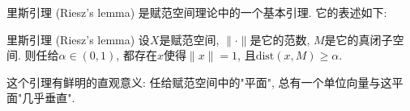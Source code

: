 
里斯引理 (Riesz's lemma) 是赋范空间理论中的一个基本引理. 它的表述如下:

\begin{lemma}{里斯引理 (Riesz's lemma)}
设$X$是赋范空间, $\|\cdot\|$是它的范数, $M$是它的真闭子空间. 则任给$\alpha\in(0,1)$, 都存在$x$使得$\|x\|=1$, 且$\text{dist}(x,M)\geq\alpha$.
\end{lemma}

这个引理有鲜明的直观意义: 任给赋范空间中的"平面", 总有一个单位向量与这平面"几乎垂直".

